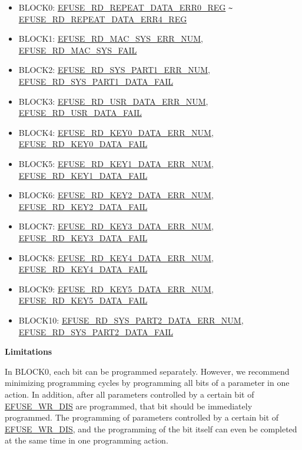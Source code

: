\documentclass[main\_\_EN.tex]{subfiles}
\begin{document}
\begin{enumerate}
\begin{itemize}
    \item BLOCK0: \hyperref[regdesc:EFUSERDREPEATDATAERR0REG]{EFUSE\_RD\_REPEAT\_DATA\_ERR0\_REG} \verb+~+ \hyperref[regdesc:EFUSERDREPEATDATAERR4REG]{EFUSE\_RD\_REPEAT\_DATA\_ERR4\_REG}
    \item BLOCK1: \hyperref[fielddesc:EFUSERDMACSYSERRNUM] {EFUSE\_RD\_MAC\_SYS\_ERR\_NUM}, \hyperref[fielddesc:EFUSERDMACSYSFAIL] {EFUSE\_RD\_MAC\_SYS\_FAIL}
    \item BLOCK2: \hyperref[fielddesc:EFUSERDSYSPART1DATAERRNUM] {EFUSE\_RD\_SYS\_PART1\_ERR\_NUM}, \hyperref[fielddesc:EFUSERDSYSPART1DATAFAIL] {EFUSE\_RD\_SYS\_PART1\_DATA\_FAIL}
    \item BLOCK3: \hyperref[fielddesc:EFUSERDUSRDATAERRNUM] {EFUSE\_RD\_USR\_DATA\_ERR\_NUM}, \hyperref[fielddesc:EFUSERDUSRDATAFAIL] {EFUSE\_RD\_USR\_DATA\_FAIL}
    \item BLOCK4: \hyperref[fielddesc:EFUSERDKEY0DATAERRNUM] {EFUSE\_RD\_KEY0\_DATA\_ERR\_NUM}, \hyperref[fielddesc:EFUSERDKEY0DATAFAIL] {EFUSE\_RD\_KEY0\_DATA\_FAIL}
    \item BLOCK5: \hyperref[fielddesc:EFUSERDKEY1DATAERRNUM] {EFUSE\_RD\_KEY1\_DATA\_ERR\_NUM}, \hyperref[fielddesc:EFUSERDKEY1DATAFAIL] {EFUSE\_RD\_KEY1\_DATA\_FAIL}
    \item BLOCK6: \hyperref[fielddesc:EFUSERDKEY2DATAERRNUM] {EFUSE\_RD\_KEY2\_DATA\_ERR\_NUM}, \hyperref[fielddesc:EFUSERDKEY2DATAFAIL] {EFUSE\_RD\_KEY2\_DATA\_FAIL}
    \item BLOCK7: \hyperref[fielddesc:EFUSERDKEY3DATAERRNUM] {EFUSE\_RD\_KEY3\_DATA\_ERR\_NUM}, \hyperref[fielddesc:EFUSERDKEY3DATAFAIL] {EFUSE\_RD\_KEY3\_DATA\_FAIL}
    \item BLOCK8: \hyperref[fielddesc:EFUSERDKEY4DATAERRNUM] {EFUSE\_RD\_KEY4\_DATA\_ERR\_NUM}, \hyperref[fielddesc:EFUSERDKEY4DATAFAIL] {EFUSE\_RD\_KEY4\_DATA\_FAIL}
    \item BLOCK9: \hyperref[fielddesc:EFUSERDKEY5DATAERRNUM] {EFUSE\_RD\_KEY5\_DATA\_ERR\_NUM}, \hyperref[fielddesc:EFUSERDKEY5DATAFAIL] {EFUSE\_RD\_KEY5\_DATA\_FAIL}
    \item BLOCK10: \hyperref[fielddesc:EFUSERDSYSPART2DATAERRNUM] {EFUSE\_RD\_SYS\_PART2\_DATA\_ERR\_NUM}, \hyperref[fielddesc:EFUSERDSYSPART2DATAFAIL] {EFUSE\_RD\_SYS\_PART2\_DATA\_FAIL}
\end{itemize}
\end{enumerate}

{\bfseries Limitations}

In BLOCK0, each bit can be programmed separately. However, we recommend minimizing programming cycles by programming all bits of a parameter in one action. In addition, after all parameters controlled by a certain bit of \hyperref[fielddesc:EFUSEWRDIS]{EFUSE\_WR\_DIS} are programmed, that bit should be immediately programmed. The programming of parameters controlled by a certain bit of \hyperref[fielddesc:EFUSEWRDIS]{EFUSE\_WR\_DIS},
and the programming of the bit itself can even be completed at the same time in one programming action.
\end{document}
